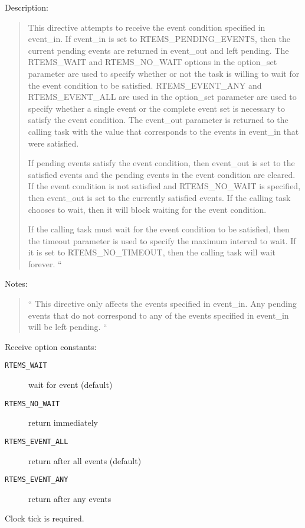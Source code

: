 Description:
\begin{quote}
This directive attempts to receive the event condition specified in event\_in.
If event\_in is set to RTEMS\_PENDING\_EVENTS,
then the current pending events are returned in event\_out and left pending.
The RTEMS\_WAIT and RTEMS\_NO\_WAIT options in the option\_set parameter
are used to specify whether or not the task is willing
to wait for the event condition to be satisfied.
RTEMS\_EVENT\_ANY and RTEMS\_EVENT\_ALL are used in the option\_set parameter
are used to specify whether a single event
or the complete event set is necessary to satisfy the event condition.
The event\_out parameter is returned to the calling task
with the value that corresponds to the events in event\_in that were satisfied.
\par
If pending events satisfy the event condition,
then event\_out is set to the satisfied events
and the pending events in the event condition are cleared.
If the event condition is not satisfied and RTEMS\_NO\_WAIT is specified,
then event\_out is set to the currently satisfied events.
If the calling task chooses to wait,
then it will block waiting for the event condition.
\par
If the calling task must wait for the event condition to be satisfied,
then the timeout parameter is used to specify the maximum interval to wait.
If it is set to RTEMS\_NO\_TIMEOUT, then the calling task will wait forever.
``
\end{quote}

Notes:
\begin{quote}
``
This directive only affects the events specified in event\_in.
Any pending events that do not correspond to
any of the events specified in event\_in will be left pending.
``
\end{quote}

Receive option constants:
\begin{description}
  \item [\texttt{RTEMS\_WAIT}] wait for event (default)
  \item [\texttt{RTEMS\_NO\_WAIT}] return immediately
  \item [\texttt{RTEMS\_EVENT\_ALL}] return after all events (default)
  \item [\texttt{RTEMS\_EVENT\_ANY}] return after any events
\end{description}
Clock tick is required.
